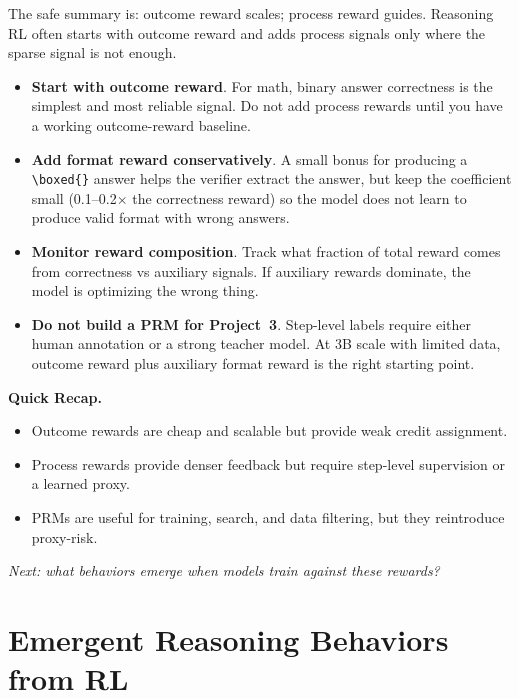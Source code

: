 The safe summary is: outcome reward scales; process reward guides. Reasoning RL often starts with outcome reward and adds process signals only where the sparse signal is not enough.

\begin{tcolorbox}[colback=orange!5, colframe=orange!60, title=\textbf{For Project~3: Choosing Your Reward Signal}]
\begin{itemize}[nosep]
  \item \textbf{Start with outcome reward}. For math, binary answer correctness is the simplest and most reliable signal. Do not add process rewards until you have a working outcome-reward baseline.
  \item \textbf{Add format reward conservatively}. A small bonus for producing a \texttt{\textbackslash boxed\{\}} answer helps the verifier extract the answer, but keep the coefficient small (0.1--0.2$\times$ the correctness reward) so the model does not learn to produce valid format with wrong answers.
  \item \textbf{Monitor reward composition}. Track what fraction of total reward comes from correctness vs auxiliary signals. If auxiliary rewards dominate, the model is optimizing the wrong thing.
  \item \textbf{Do not build a PRM for Project~3}. Step-level labels require either human annotation or a strong teacher model. At 3B scale with limited data, outcome reward plus auxiliary format reward is the right starting point.
\end{itemize}
\end{tcolorbox}

\begin{quickrecap}
\textbf{Quick Recap.}
\begin{itemize}[nosep,leftmargin=1.5em]
  \item Outcome rewards are cheap and scalable but provide weak credit assignment.
  \item Process rewards provide denser feedback but require step-level supervision or a learned proxy.
  \item PRMs are useful for training, search, and data filtering, but they reintroduce proxy-risk.
\end{itemize}
\textit{Next: what behaviors emerge when models train against these rewards?}
\end{quickrecap}


\section{Emergent Reasoning Behaviors from RL}
\label{sec:emergent-reasoning}


